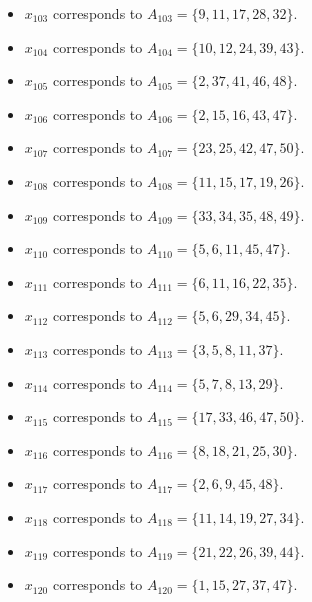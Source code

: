 \documentclass[11pt]{article}
\begin{document}
\begin{itemize}
\item $x_{103}$ corresponds to $A_{103}=\{9, 11, 17, 28, 32\}$.
\item $x_{104}$ corresponds to $A_{104}=\{10, 12, 24, 39, 43\}$.
\item $x_{105}$ corresponds to $A_{105}=\{2, 37, 41, 46, 48\}$.
\item $x_{106}$ corresponds to $A_{106}=\{2, 15, 16, 43, 47\}$.
\item $x_{107}$ corresponds to $A_{107}=\{23, 25, 42, 47, 50\}$.
\item $x_{108}$ corresponds to $A_{108}=\{11, 15, 17, 19, 26\}$.
\item $x_{109}$ corresponds to $A_{109}=\{33, 34, 35, 48, 49\}$.
\item $x_{110}$ corresponds to $A_{110}=\{5, 6, 11, 45, 47\}$.
\item $x_{111}$ corresponds to $A_{111}=\{6, 11, 16, 22, 35\}$.
\item $x_{112}$ corresponds to $A_{112}=\{5, 6, 29, 34, 45\}$.
\item $x_{113}$ corresponds to $A_{113}=\{3, 5, 8, 11, 37\}$.
\item $x_{114}$ corresponds to $A_{114}=\{5, 7, 8, 13, 29\}$.
\item $x_{115}$ corresponds to $A_{115}=\{17, 33, 46, 47, 50\}$.
\item $x_{116}$ corresponds to $A_{116}=\{8, 18, 21, 25, 30\}$.
\item $x_{117}$ corresponds to $A_{117}=\{2, 6, 9, 45, 48\}$.
\item $x_{118}$ corresponds to $A_{118}=\{11, 14, 19, 27, 34\}$.
\item $x_{119}$ corresponds to $A_{119}=\{21, 22, 26, 39, 44\}$.
\item $x_{120}$ corresponds to $A_{120}=\{1, 15, 27, 37, 47\}$.
\end{itemize}
\end{document}
